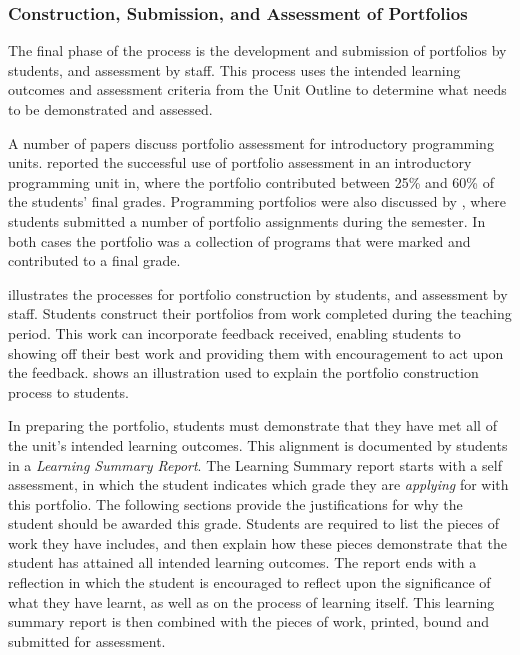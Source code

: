 
\subsubsection{Construction, Submission, and Assessment of Portfolios} %
\label{ssub:construction_submission_and_assessment_of_portfolios}

The final phase of the process is the development and submission of portfolios by students, and assessment by staff. This process uses the intended learning outcomes and assessment criteria from the Unit Outline to determine what needs to be demonstrated and assessed. 

A number of papers discuss portfolio assessment for introductory programming units. \cite{Plimmer:2000} reported the successful use of portfolio assessment in an introductory programming unit in, where the portfolio contributed between 25\% and 60\% of the students' final grades. Programming portfolios were also discussed by \cite{Jones:2010}, where students submitted a number of portfolio assignments during the semester. In both cases the portfolio was a collection of programs that were marked and contributed to a final grade. 

 illustrates the processes for portfolio construction by students, and assessment by staff. Students construct their portfolios from work completed during the teaching period. This work can incorporate feedback received, enabling students to showing off their best work and providing them with encouragement to act upon the feedback.  shows an illustration used to explain the portfolio construction process to students. 

In preparing the portfolio, students must demonstrate that they have met all of the unit's intended learning outcomes. This alignment is documented by students in a \emph{Learning Summary Report}. The Learning Summary report starts with a self assessment, in which the student indicates which grade they are \emph{applying} for with this portfolio. The following sections provide the justifications for why the student should be awarded this grade. Students are required to list the pieces of work they have includes, and then explain how these pieces demonstrate that the student has attained all intended learning outcomes. The report ends with a reflection in which the student is encouraged to reflect upon the significance of what they have learnt, as well as on the process of learning itself. This learning summary report is then combined with the pieces of work, printed, bound and submitted for assessment.

